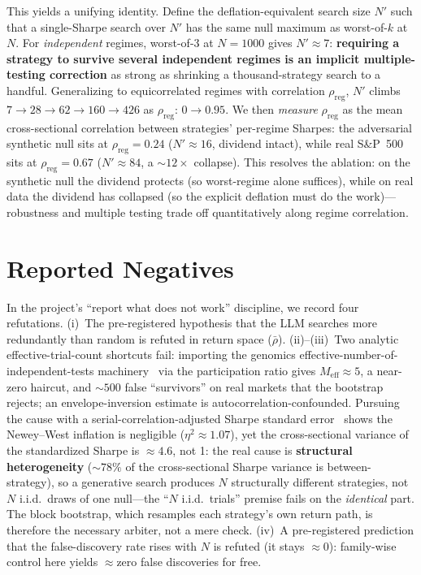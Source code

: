 \documentclass[conference]{IEEEtran}
\begin{document}
This yields a unifying identity. Define the deflation-equivalent search size $N'$ such that a
single-Sharpe search over $N'$ has the same null maximum as worst-of-$k$ at $N$. For
\emph{independent} regimes, worst-of-3 at $N{=}1000$ gives $N'\!\approx\!7$: \textbf{requiring
a strategy to survive several independent regimes is an implicit multiple-testing correction}
as strong as shrinking a thousand-strategy search to a handful. Generalizing to equicorrelated
regimes with correlation $\rho_\mathrm{reg}$, $N'$ climbs $7\!\to\!28\!\to\!62\!\to\!160\!\to\!
426$ as $\rho_\mathrm{reg}\!:\,0\!\to\!0.95$. We then \emph{measure} $\rho_\mathrm{reg}$ as the
mean cross-sectional correlation between strategies' per-regime Sharpes: the adversarial
synthetic null sits at $\rho_\mathrm{reg}\!=\!0.24$ ($N'\!\approx\!16$, dividend intact),
while real S\&P~500 sits at $\rho_\mathrm{reg}\!=\!0.67$ ($N'\!\approx\!84$, a ${\sim}12\times$
collapse). This resolves the ablation: on the synthetic null the dividend protects (so
worst-regime alone suffices), while on real data the dividend has collapsed (so the explicit
deflation must do the work)---robustness and multiple testing trade off quantitatively along
regime correlation.

\section{Reported Negatives}
In the project's ``report what does not work'' discipline, we record four refutations.
(i)~The pre-registered hypothesis that the LLM searches more redundantly than random is
refuted in return space ($\bar\rho$). (ii)--(iii)~Two analytic effective-trial-count
shortcuts fail: importing the genomics effective-number-of-independent-tests
machinery~\cite{nyholt,liji} via the participation ratio gives $M_\mathrm{eff}\!\approx\!5$,
a near-zero haircut, and ${\sim}500$ false ``survivors'' on real markets that the bootstrap
rejects; an envelope-inversion estimate is autocorrelation-confounded. Pursuing the cause with
a serial-correlation-adjusted Sharpe standard error~\cite{lo} shows the Newey--West inflation
is negligible ($\eta^2\!\approx\!1.07$), yet the cross-sectional variance of the standardized
Sharpe is ${\approx}4.6$, not 1: the real cause is \textbf{structural heterogeneity}
(${\sim}78\%$ of the cross-sectional Sharpe variance is between-strategy), so a generative
search produces $N$ structurally different strategies, not $N$ i.i.d.\ draws of one null---the
``$N$ i.i.d.\ trials'' premise fails on the \emph{identical} part. The block bootstrap, which
resamples each strategy's own return path, is therefore the necessary arbiter, not a mere
check. (iv)~A pre-registered prediction that the false-discovery rate rises with $N$ is
refuted (it stays ${\approx}0$): family-wise control here yields ${\approx}$zero false
discoveries for free.
\end{document}
